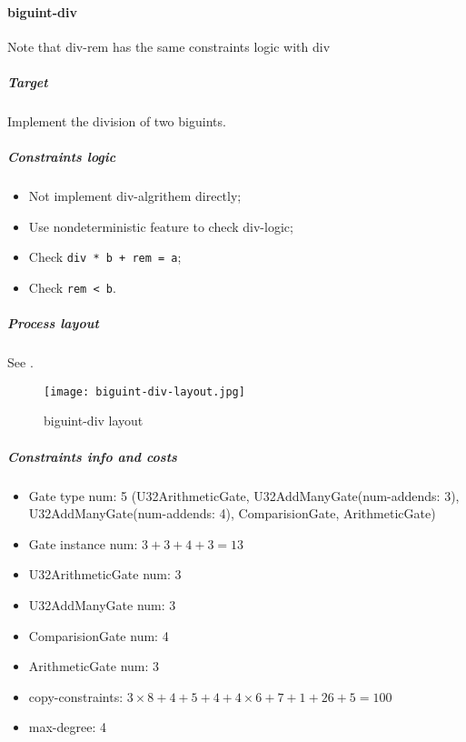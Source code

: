 \paragraph{biguint-div}

Note that div-rem has the same constraints logic with div

\subparagraph{Target}
Implement the division of two biguints.

\subparagraph{Constraints logic}
\begin{itemize}
    \item Not implement div-algrithem directly;
    \item Use nondeterministic feature to check div-logic;
    \item Check \verb|div * b + rem = a|;
    \item Check \verb|rem < b|.
\end{itemize}

\subparagraph{Process layout}
See .
\begin{figure}[!ht]
    \centering
    \texttt{[image: biguint-div-layout.jpg]}
    \caption{biguint-div layout}
    \label{fig:biguint-div-layout}
\end{figure}

\subparagraph{Constraints info and costs}
\begin{itemize}
    \item Gate type num: 5 (U32ArithmeticGate, U32AddManyGate(num-addends: 3), U32AddManyGate(num-addends: 4), ComparisionGate, ArithmeticGate)
    \item Gate instance num: $3 + 3 + 4 + 3 = 13$
    \item U32ArithmeticGate num: 3
    \item U32AddManyGate num: 3
    \item ComparisionGate num: 4
    \item ArithmeticGate num: 3
    \item copy-constraints: $3 \times 8 + 4 + 5 + 4 + 4 \times 6 + 7 + 1 + 26 + 5 = 100$
    \item max-degree: 4
\end{itemize}
